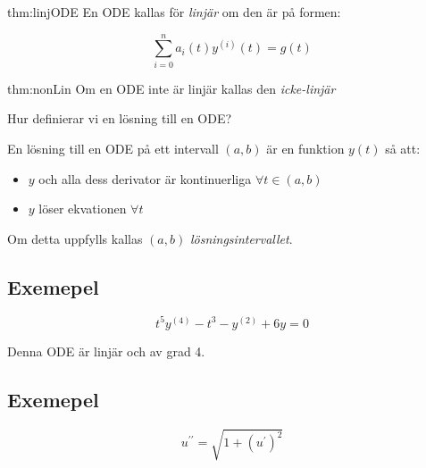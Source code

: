 \begin{theo}{thm:linjODE}
  En ODE kallas för \textit{linjär} om den är på formen:

  \begin{equation*}
    \sum_{i=0}^{n}a_i(t)y^{(i)}(t) = g(t)
  \end{equation*}
\end{theo}
\par\bigskip

\begin{theo}{thm:nonLin}
  Om en ODE inte är linjär kallas den \textit{icke-linjär}
\end{theo}
\par\bigskip

\noindent Hur definierar vi en lösning till en ODE?
\par\bigskip
En lösning till en ODE på ett intervall $(a,b)$ är en funktion $y(t)$ så att:

\begin{itemize}
  \item $y$ och alla dess derivator är kontinuerliga $\forall t\in(a,b)$
  \item $y$ löser ekvationen $\forall t$
\end{itemize}
\par\bigskip
Om detta uppfylls kallas $(a,b)$ \textit{lösningsintervallet}.

\subsection{Exemepel}
\par\bigskip

\begin{equation*}
  t^5y^{(4)}-t^3-y^{(2)}+6y=0
\end{equation*}
\par\bigskip

Denna ODE är linjär och av grad 4.
\par\bigskip

\subsection{Exemepel}
\par\bigskip


\begin{equation*}
  u^{\prime\prime}=\sqrt{1+(u^{\prime})^2}
\end{equation*}
\par\bigskip

